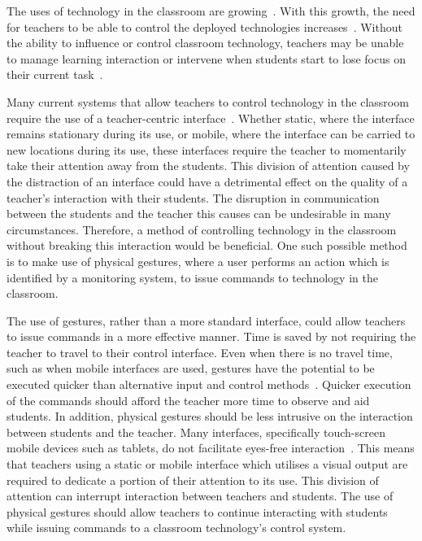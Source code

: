 \documentclass[manuscript, review, screen]{acmart}
\begin{document}
The uses of technology in the classroom are growing~\cite{Lloyd2011,Robertson2012,Schrum2008}.
With this growth, the need for teachers to be able to control the deployed technologies increases~\cite{Apple1990,Selwyn2010,Selwyn2011}.
Without the ability to influence or control classroom technology, teachers may be unable to manage learning interaction or intervene when students start to lose focus on their current task~\cite{Chen2005,Karabenick2011}.


Many current systems that allow teachers to control technology in the classroom require the use of a teacher-centric interface~\cite{Dagdag2011,Kuhn2005,Vila,Zhou2010}.
Whether static, where the interface remains stationary during its use, or mobile, where the interface can be carried to new locations during its use, these interfaces require the teacher to momentarily take their attention away from the students.
This division of attention caused by the distraction of an interface could have a detrimental effect on the quality of a teacher's interaction with their students.
The disruption in communication between the students and the teacher this causes can be undesirable in many circumstances.
Therefore, a method of controlling technology in the classroom without breaking this interaction would be beneficial.
One such possible method is to make use of physical gestures, where a user performs an action which is identified by a monitoring system, to issue commands to technology in the classroom.

The use of gestures, rather than a more standard interface, could allow teachers to issue commands in a more effective manner.
Time is saved by not requiring the teacher to travel to their control interface.
Even when there is no travel time, such as when mobile interfaces are used, gestures have the potential to be executed quicker than alternative input and control methods~\cite{Dulberg1999,Moyle2001}.
Quicker execution of the commands should afford the teacher more time to observe and aid students.
In addition, physical gestures should be less intrusive on the interaction between students and the teacher. 
Many interfaces, specifically touch-screen mobile devices such as tablets, do not facilitate eyes-free interaction~\cite{Brewster2003}.
This means that teachers using a static or mobile interface which utilises a visual output are required to dedicate a portion of their attention to its use.
This division of attention can interrupt interaction between teachers and students.
The use of physical gestures should allow teachers to continue interacting with students while issuing commands to a classroom technology's control system.
\end{document}
